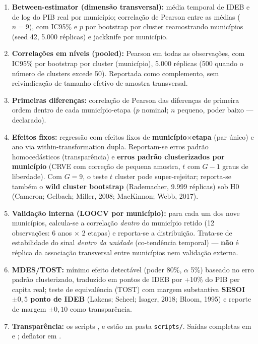 \documentclass[12pt,a4paper]{article}
\begin{document}
\begin{enumerate}
\item \textbf{Between-estimator (dimensão transversal):} média temporal de IDEB e de log do PIB real por município; correlação de Pearson entre as médias ($n = 9$), com IC95\% e $p$ por bootstrap por cluster reamostrando municípios (seed 42, 5.000 réplicas) e jackknife por município.
\item \textbf{Correlações em níveis (pooled):} Pearson em todas as observações, com IC95\% por bootstrap por cluster (município), 5.000 réplicas (500 quando o número de clusters excede 50). Reportada como complemento, sem reivindicação de tamanho efetivo de amostra transversal.
\item \textbf{Primeiras diferenças:} correlação de Pearson das diferenças de primeira ordem dentro de cada município-etapa ($p$ nominal; $n$ pequeno, poder baixo --- declarado).
\item \textbf{Efeitos fixos:} regressão com efeitos fixos de \textbf{município$\times$etapa} (par único) e ano via within-transformation dupla. Reportam-se erros padrão homocedásticos (transparência) e \textbf{erros padrão clusterizados por município} (CRVE com correção de pequena amostra, $t$ com $G-1$ graus de liberdade). Com $G = 9$, o teste $t$ cluster pode super-rejeitar; reporta-se também o \textbf{wild cluster bootstrap} (Rademacher, 9.999 réplicas) sob H0 (Cameron; Gelbach; Miller, 2008; MacKinnon; Webb, 2017).
\item \textbf{Validação interna (LOOCV por município):} para cada um dos nove municípios, calcula-se a correlação \textit{dentro} do município retido (12 observações: 6 anos $\times$ 2 etapas) e reporta-se a distribuição. Trata-se de estabilidade do sinal \textit{dentro da unidade} (co-tendência temporal) --- \textbf{não} é réplica da associação transversal entre municípios nem validação externa.
\item \textbf{MDES/TOST:} mínimo efeito detectável (poder 80\%, $\alpha$ 5\%) baseado no erro padrão clusterizado, traduzido em pontos de IDEB por +10\% do PIB per capita real; teste de equivalência (TOST) com margem substantiva \textbf{SESOI $\pm 0{,}5$ ponto de IDEB} (Lakens; Scheel; Isager, 2018; Bloom, 1995) e reporte de margem $\pm 0{,}10$ como transparência.
\item \textbf{Transparência:} os scripts ,  e  estão na pasta \texttt{scripts/}. Saídas completas em  e ; deflator em .
\end{enumerate}
\end{document}
